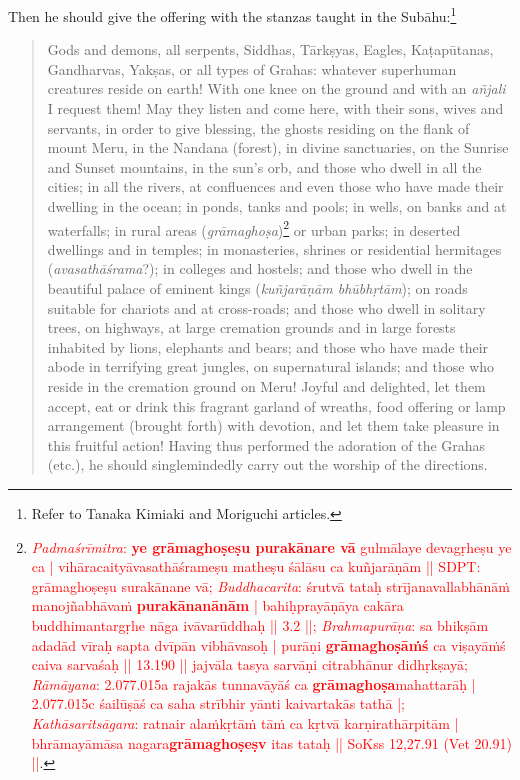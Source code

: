 \documentclass[11pt]{book}
\newcommand{\red}[1]{\textcolor{red}{#1}}
\newcommand{\skt}[1]{\emph{#1}}
\begin{document}
Then he should give the offering with the stanzas taught in the Subāhu:\footnote{Refer to Tanaka Kimiaki and Moriguchi articles.}
 \begin{verse}
 Gods and demons, all serpents, Siddhas, Tārkṣyas, Eagles, Kaṭapūtanas, Gandharvas, Yakṣas, or all types of Grahas: whatever superhuman creatures reside on earth!
With one knee on the ground and with an \skt{añjali} I request them! May they listen and come here, with their sons, wives and servants, in order to give blessing, the ghosts residing on the flank of mount Meru, in the Nandana (forest), in divine sanctuaries, on the Sunrise and Sunset mountains, in the sun's orb, and those who dwell in all the cities; in all the rivers, at confluences and even those who have made their dwelling in the ocean; in ponds, tanks and pools; in wells, on banks and at waterfalls; in rural areas (\emph{grāmaghoṣa})\footnote{\red{\textit{Padmaśrīmitra}: \textbf{ye grāmaghoṣeṣu purakānare vā} gulmālaye devagṛheṣu ye ca |
vihāracaityāvasathāśrameṣu matheṣu śālāsu ca kuñjarāṇām ||
SDPT: grāmaghoṣeṣu surakānane vā;
\textit{Buddhacarita}:
śrutvā tataḥ strījanavallabhānāṁ manojñabhāvaṁ \textbf{purakānanānām} |
bahiḥprayāṇāya cakāra buddhimantargṛhe nāga ivāvarūddhaḥ || 3.2 ||;
\textit{Brahmapurāṇa}: sa bhikṣām adadād vīraḥ sapta dvīpān vibhāvasoḥ |
purāṇi \textbf{grāmaghoṣāṁś} ca  viṣayāṁś caiva sarvaśaḥ  || 13.190 ||
jajvāla tasya sarvāṇi  citrabhānur didhṛkṣayā;
\textit{Rāmāyana}: 2.077.015a rajakās tunnavāyāś ca \textbf{grāmaghoṣa}mahattarāḥ |
2.077.015c śailūṣāś ca saha strībhir yānti kaivartakās tathā |;
\textit{Kathāsaritsāgara}: ratnair alaṁkṛtāṁ tāṁ ca kṛtvā karṇirathārpitām |
bhrāmayāmāsa nagara\textbf{grāmaghoṣeṣv} itas tataḥ || SoKss 12,27.91 (Vet 20.91) ||}.} or urban parks; in deserted dwellings and in temples; in monasteries, shrines or residential hermitages (\emph{avasathāśrama}?); in colleges and hostels; and those who dwell in the beautiful palace of eminent kings (\emph{kuñjarāṇām bhūbhṛtām}); on roads suitable for chariots and at cross-roads; and those who dwell in solitary trees, on highways, at large cremation grounds and in large forests inhabited by lions, elephants and bears; and those who have made their abode in terrifying great jungles, on supernatural islands; and those who reside in the cremation ground on Meru! Joyful and delighted, let them accept, eat or drink this fragrant garland of wreaths, food offering or lamp arrangement (brought forth) with devotion, and let them take pleasure in this fruitful action!
	Having thus performed the adoration of the Grahas (etc.), he should singlemindedly carry out the worship of the directions.

\end{verse}
\end{document}
